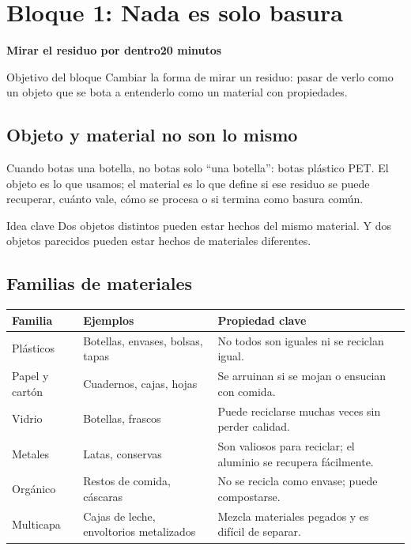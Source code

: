 \documentclass[10pt,a4paper]{article}
\newcommand{\blocktitle}[2]{%
  \vspace{2mm}
  {\large\bfseries\color{AIEPNavy}#1}\hfill{\small\bfseries\textcolor{AIEPRed}{#2}}\par
  \vspace{1mm}
}
\begin{document}
\newpage
\section{Bloque 1: Nada es solo basura}
\blocktitle{Mirar el residuo por dentro}{20 minutos}

\begin{infobox}{Objetivo del bloque}
Cambiar la forma de mirar un residuo: pasar de verlo como un objeto que se bota a entenderlo como un material con propiedades.
\end{infobox}

\subsection{Objeto y material no son lo mismo}
Cuando botas una botella, no botas solo ``una botella'': botas plástico PET. El objeto es lo que usamos; el material es lo que define si ese residuo se puede recuperar, cuánto vale, cómo se procesa o si termina como basura común.

\begin{keybox}{Idea clave}
Dos objetos distintos pueden estar hechos del mismo material. Y dos objetos parecidos pueden estar hechos de materiales diferentes.
\end{keybox}

\subsection{Familias de materiales}
\begin{tabularx}{\textwidth}{@{}p{25mm}p{44mm}Y@{}}
\textbf{\color{AIEPNavy}Familia} & \textbf{\color{AIEPNavy}Ejemplos} & \textbf{\color{AIEPNavy}Propiedad clave} \\
\hline
Plásticos & Botellas, envases, bolsas, tapas & No todos son iguales ni se reciclan igual. \\
Papel y cartón & Cuadernos, cajas, hojas & Se arruinan si se mojan o ensucian con comida. \\
Vidrio & Botellas, frascos & Puede reciclarse muchas veces sin perder calidad. \\
Metales & Latas, conservas & Son valiosos para reciclar; el aluminio se recupera fácilmente. \\
Orgánico & Restos de comida, cáscaras & No se recicla como envase; puede compostarse. \\
Multicapa & Cajas de leche, envoltorios metalizados & Mezcla materiales pegados y es difícil de separar. \\
\end{tabularx}
\end{document}
